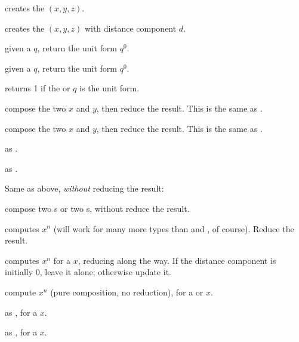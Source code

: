  creates the  $(x,y,z)$.

 creates the  $(x,y,z)$
with distance component $d$.

 given a  $q$, return the unit form $q^0$.

 given a  $q$, return the unit form $q^0$.

 returns 1 if the  or 
$q$ is the unit form.


 compose the two  $x$ and $y$,
then reduce the result. This is the same as .

 compose the two  $x$ and $y$,
then reduce the result. This is the same as .

 as .

 as .

\noindent Same as above, \emph{without} reducing the result:





 compose two s or two s,
without reduce the result.


 computes $x^n$ (will work for many more types
than  and , of course). Reduce the result.

 computes $x^n$ for a  $x$, reducing
along the way. If the distance component is initially $0$, leave it alone;
otherwise update it.

 compute $x^n$ (pure composition, no
reduction), for a  or  $x$.

 as , for a  $x$.

 as , for a  $x$.

